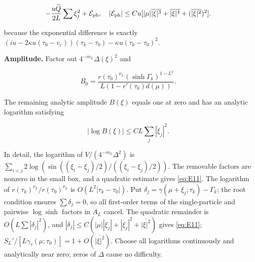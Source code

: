 \documentclass[11pt,a4paper]{article}
\numberwithin{equation}{section}
\theoremstyle{plain}
\theoremstyle{definition}
\begin{document}
\begin{equation}
-\frac{u\widetilde Q}{2L}\sum\xi_j^2+\mathcal E_{\rm ph},\quad |\mathcal E_{\rm ph}|\le C u[|\mu|\overline{|\xi|^3}+\overline{|\xi|^4}+(\overline{|\xi|^2})^2].
\label{eq:E10}
\end{equation}

because the exponential difference is exactly \((iu-2\kappa u(\tau_0-v_c))(\tau_k-\tau_0)-\kappa u(\tau_k-\tau_0)^2\).

\textbf{Amplitude.} Factor out \(4^{-m_L}\Delta(\xi)^2\) and

\[ B_0=\frac{r(\tau_0)^{\nu_L}(\sinh\Gamma_k)^{1-L^2}}{L(1-r'(\tau_0)d(\mu))}. \]

The remaining analytic amplitude \(B(\xi)\) equals one at zero and has an analytic logarithm satisfying

\begin{equation}
|\log B(\xi)|\le C L\sum_j|\xi_j|^2.
\label{eq:E11}
\end{equation}

In detail, the logarithm of \(V/(4^{-m_L}\Delta^2)\) is \(\sum_{i<j}2\log(\sin((\xi_i-\xi_j)/2)/((\xi_i-\xi_j)/2))\). The removable factors are nonzero in the small box, and a quadratic estimate gives \eqref{eq:E11}. The logarithm of \(r(\tau_k)^{\nu_L}/r(\tau_0)^{\nu_L}\) is \(O(L^2|\tau_k-\tau_0|)\). Put \(\delta_j=\gamma(\mu+\xi_j;\tau_k)-\Gamma_k\); the root condition ensures \(\sum\delta_j=0\), so all first-order terms of the single-particle and pairwise \(\log\sinh\) factors in \(A_L\) cancel. The quadratic remainder is \(O(L\sum|\delta_j|^2)\), and \(|\delta_j|\le C(|\mu||\xi_j|+|\xi_j|^2+\overline{|\xi|^2})\) gives \eqref{eq:E11}; \(S_L'/[L\gamma_\tau(\mu;\tau_0)]=1+O(\overline{|\xi|^2})\). Choose all logarithms continuously and analytically near zero; zeros of \(\Delta\) cause no difficulty.
\end{document}
